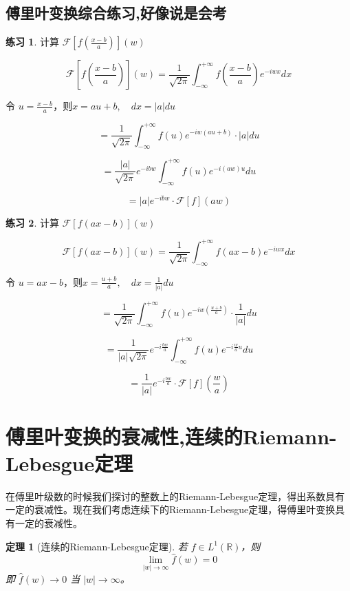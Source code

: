 \documentclass[12pt,a4paper]{article}
\theoremstyle{plain}
\newtheorem{theorem}{定理}[section]
\theoremstyle{definition}
\newtheorem{exercise}{练习}[section]  %
\theoremstyle{remark}
\begin{document}
	\subsection{傅里叶变换综合练习,好像说是会考}
	
	\begin{exercise}
		计算 $\mathcal{F}\left[ f\left( \frac{x-b}{a} \right) \right](w)$
		
		
		\[
		\mathcal{F}\left[ f\left( \frac{x-b}{a} \right) \right](w) = \frac{1}{\sqrt{2\pi}} \int_{-\infty}^{+\infty} f\left( \frac{x-b}{a} \right) e^{-iwx} dx
		\]
		
		令 $u = \frac{x-b}{a}$，则$x = au + b, \quad dx = |a|du$
		
		\[
		= \frac{1}{\sqrt{2\pi}} \int_{-\infty}^{+\infty} f(u) e^{-iw(au+b)} \cdot |a|du
		\]
		
		\[
		= \frac{|a|}{\sqrt{2\pi}} e^{-ibw} \int_{-\infty}^{+\infty} f(u) e^{-i(a w)u} du
		\]
		
		\[
		= |a| e^{-ibw} \cdot \mathcal{F}[f](aw)
		\]
		
	\end{exercise}
	
	\begin{exercise}
		计算 $\mathcal{F}\left[ f(ax-b) \right](w)$
		
		\[
		\mathcal{F}\left[ f(ax-b) \right](w) = \frac{1}{\sqrt{2\pi}} \int_{-\infty}^{+\infty} f(ax-b) e^{-iwx} dx
		\]
		
		令 $u = ax - b$，则$x = \frac{u + b}{a}, \quad dx = \frac{1}{|a|}du$
		
		\[
		= \frac{1}{\sqrt{2\pi}} \int_{-\infty}^{+\infty} f(u) e^{-iw\left(\frac{u+b}{a}\right)} \cdot \frac{1}{|a|}du
		\]
		
		\[
		= \frac{1}{|a|\sqrt{2\pi}} e^{-i\frac{bw}{a}} \int_{-\infty}^{+\infty} f(u) e^{-i\frac{w}{a}u} du
		\]
		
		\[
		= \frac{1}{|a|} e^{-i\frac{bw}{a}} \cdot \mathcal{F}[f]\left( \frac{w}{a} \right)
		\]
	\end{exercise}
	
	\section{傅里叶变换的衰减性,连续的Riemann-Lebesgue定理}
	
	在傅里叶级数的时候我们探讨的整数上的Riemann-Lebesgue定理，得出系数具有一定的衰减性。现在我们考虑连续下的Riemann-Lebesgue定理，得傅里叶变换具有一定的衰减性。
	
	\begin{theorem}[连续的Riemann-Lebesgue定理]
		若 \( f \in L^1(\mathbb{R}) \)，则
		\[
		\lim_{|w| \to \infty} \hat{f}(w) = 0
		\]
		即 \( \hat{f}(w) \to 0 \) 当 \( |w| \to \infty \)。
	\end{theorem}
	
\end{document}
